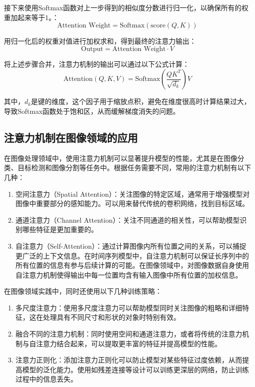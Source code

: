 接下来使用Softmax函数对上一步得到的相似度分数进行归一化，以确保所有的权重加起来等于1。：
\begin{equation}
   \text{Attention Weight} = \text{Softmax}(\text{score}(Q, K))
\end{equation}

用归一化后的权重对值进行加权求和，得到最终的注意力输出：
\begin{equation}
  \text{Output} = \text{Attention Weight} \cdot V 
\end{equation}

将上述步骤合并，注意力机制的输出可以通过以下公式计算：
\begin{equation}
\text{Attention}(Q, K, V) = \text{Softmax}\left(\frac{QK^T}{\sqrt{d_k}}\right)V 
\end{equation}

其中，\(d_k\)是键的维度，这个因子用于缩放点积，避免在维度很高时计算结果过大，导致Softmax函数处于饱和区，从而缓解梯度消失的问题\cite{vaswani2017attention}。
\subsection{注意力机制在图像领域的应用}
在图像处理领域中，使用注意力机制可以显著提升模型的性能，尤其是在图像分类、目标检测和图像分割等任务中。根据任务需要不同，常用的注意力机制有以下几种：
\begin{enumerate}    
  \item 空间注意力（Spatial Attention）：关注图像的特定区域，通常用于增强模型对图像中重要部分的感知能力。可以用来替代传统的卷积网络，找到目标区域。
  \item 通道注意力（Channel Attention）：关注不同通道的相关性，可以帮助模型识别哪些特征是更加重要的。
  \item 自注意力（Self-Attention）：通过计算图像内所有位置之间的关系，可以捕捉更广泛的上下文信息。在时间序列模型中，自注意力机制可以保证长序列中的所有位置的信息有参与后续计算的可能。在图像领域中，对图像数据自身使用自注意力机制使得输出中每一位置均含有输入图像中所有位置的加权信息。
\end{enumerate}

在图像领域实践中，同时还使用以下几种训练策略：
\begin{enumerate}    
  \item 多尺度注意力：使用多尺度注意力可以帮助模型同时关注图像的粗略和详细特征，这在处理具有不同尺寸和形状的对象时特别有效。
  \item 融合不同的注意力机制：同时使用空间和通道注意力，或者将传统的注意力机制与自注意力结合起来，可以提取更丰富的特征并提高模型的性能。
  \item 注意力正则化：添加注意力正则化可以防止模型对某些特征过度依赖，从而提高模型的泛化能力。使用如残差连接等设计可以训练更深层的网络，防止训练过程中的信息丢失。
\end{enumerate}


